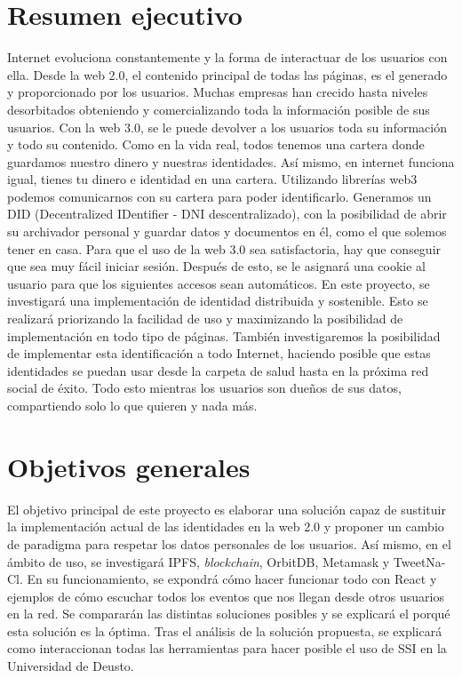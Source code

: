 \section{Resumen ejecutivo}
Internet evoluciona constantemente y la forma de interactuar de los usuarios con ella. Desde la web 2.0, el contenido principal de todas las páginas, es el generado y proporcionado por los usuarios. Muchas empresas han crecido hasta niveles desorbitados obteniendo y comercializando toda la información posible de sus usuarios. Con la web 3.0, se le puede devolver a los usuarios toda su información y todo su contenido. Como en la vida real, todos tenemos una cartera donde guardamos nuestro dinero y nuestras identidades. Así mismo, en internet funciona igual, tienes tu dinero e identidad en una cartera. Utilizando librerías web3 podemos comunicarnos con su cartera para poder identificarlo. Generamos un DID (Decentralized IDentifier - DNI descentralizado), con la posibilidad de abrir su archivador personal y guardar datos y documentos en él, como el que solemos tener en casa. Para que el uso de la web 3.0 sea satisfactoria, hay que conseguir que sea muy fácil iniciar sesión. Después de esto, se le asignará una cookie al usuario para que los siguientes accesos sean automáticos. En este proyecto, se investigará una implementación de identidad distribuida y sostenible. Esto se realizará priorizando la facilidad de uso y maximizando la posibilidad de implementación en todo tipo de páginas. También investigaremos la posibilidad de implementar esta identificación a todo Internet, haciendo posible que estas identidades se puedan usar desde la carpeta de salud hasta en la próxima red social de éxito. Todo esto mientras los usuarios son dueños de sus datos, compartiendo solo lo que quieren y nada más.
\section{Objetivos generales}
El objetivo principal de este proyecto es elaborar una solución capaz de sustituir la implementación actual de las identidades en la web 2.0 y proponer un cambio de paradigma para respetar los datos personales de los usuarios. Así mismo, en el ámbito de uso, se investigará IPFS, \textit{blockchain}, OrbitDB, Metamask y TweetNa-Cl. En su funcionamiento, se expondrá cómo hacer funcionar todo con React y ejemplos de cómo escuchar todos los eventos que nos llegan desde otros usuarios en la red. Se compararán las distintas soluciones posibles y se explicará el porqué esta solución es la óptima.
Tras el análisis de la solución propuesta, se explicará como interaccionan todas las herramientas para hacer posible el uso de SSI en la Universidad de Deusto.
